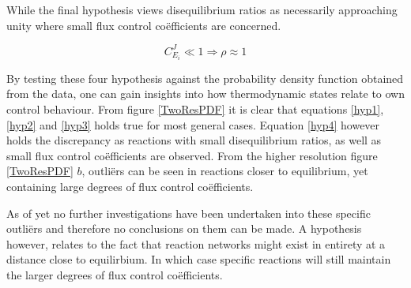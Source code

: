 While the final hypothesis views disequilibrium ratios as necessarily approaching unity where small flux control co\"efficients are concerned.

\begin{equation}\label{hyp4}
    C_{E_i}^J \ll 1 \Longrightarrow \rho \approx 1
\end{equation}

By testing these four hypothesis against the probability density function obtained from the data, one can gain insights into how thermodynamic states relate to own control behaviour. From figure \ref{TwoResPDF} it is clear that equations \ref{hyp1}, \ref{hyp2} and \ref{hyp3} holds true for most general cases. Equation \ref{hyp4} however holds the discrepancy as reactions with small disequilibrium ratios, as well as small flux control co\"efficients are observed. From the higher resolution figure \ref{TwoResPDF} $b$, outli\"ers can be seen in reactions closer to equilibrium, yet containing large degrees of flux control co\"efficients.

As of yet no further investigations have been undertaken into these specific outli\"ers and therefore no conclusions on them can be made. A hypothesis however, relates to the fact that reaction networks might exist in entirety at a distance close to equilirbium. In which case specific reactions will still maintain the larger degrees of flux control co\"efficients.





